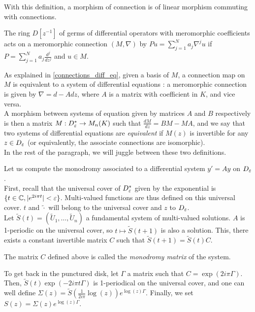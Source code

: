 With this definition, a morphism of connection is of linear morphism commuting with connections.


\begin{myrem}
The ring $D[z^{-1}]$ of germs of differential operators with meromorphic coefficients acts on a meromorphic connection $(M,\nabla)$ by $Pu = \sum_{j=1}^N a_j \nabla^j u$ if $P = \sum_{j=1}^N a_j \frac{d^j}{dz^j}$ and $u\in M$.
\end{myrem}


\begin{myrem}
As explained in \ref{connections_diff_eq}, given a basis of $M$, a connection map on $M$ is equivalent to a system of differential equations : a meromorphic connection is given by $\nabla = d - A dz$, where $A$ is a matrix with coefficient in $K$, and vice versa.\\
A morphism between systems of equation given by matrices $A$ and $B$ respectively is then a matrix $M : D_\varepsilon^* \to M_n(K)$ such that $\frac{dM}{dz} = BM - MA$, and we say that two systems of differential equations are \textit{equivalent} if $M(z)$ is invertible for any $z \in D_\varepsilon$ (or equivalently, the associate connections are isomorphic). \\
In the rest of the paragraph, we will juggle between these two definitions.
\end{myrem}


Let us compute the monodromy associated to a differential system $y' = Ay$ on $D_\varepsilon$.\\
First, recall that the universal cover of $D_\varepsilon^*$ given by the exponential is $\{t\in \mathbb{C}, |e^{2i \pi t}| < \varepsilon\}$. Multi-valued functions are thus defined on this universal cover. $t$ and $\tilde{\cdot}$ will belong to the universal cover and $z$ to $D_\varepsilon$.\\
Let $\tilde{S}(t) = (\tilde{U}_1,\dots,\tilde{U}_n)$ a fundamental system of multi-valued solutions. $A$ is 1-periodic on the universal cover, so $t \mapsto \tilde{S}(t+1)$ is also a solution. This, there exists a constant invertible matrix $C$ such that $\tilde{S}(t+1) = \tilde{S}(t) C$.

\begin{mydef}
The matrix $C$ defined above is called the \textit{monodromy matrix} of the system.
\end{mydef}

To get back in the punctured disk, let $\Gamma$ a matrix such that $C = \exp(2i \pi \Gamma)$. Then, $\tilde{S}(t)\exp(-2i\pi t \Gamma)$ is 1-periodical on the universal cover, and one can well define $\Sigma(z) = \tilde{S}(\frac{1}{2i\pi}\log(z))e^{\log(z)\Gamma}$. Finally, we set $S(z) = \Sigma(z) e^{\log(z) \Gamma}$.


